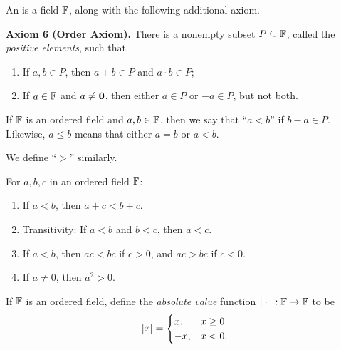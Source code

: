 \documentclass[11pt,twoside=off,numbers=noenddot]{scrbook}
\begin{document}
\begin{definition}
  An  is a field $\mathbb F$, along with the following
  additional axiom.

  \textbf{Axiom 6 (Order Axiom).} There is a nonempty subset $P
  \subseteq \mathbb F$, called the \textit{positive elements}, such that
  \begin{enumerate}
    \item If $a, b \in P$, then $a + b \in P$ and $a \cdot b \in P$;
    \item If $a \in \mathbb F$ and $a \neq \textbf{0}$, then either $a \in P$ or
      $-a \in P$, but not both.
  \end{enumerate}
\end{definition}

\begin{definition}[Inequalities]
  If $\mathbb F$ is an ordered field and $a, b \in \mathbb F$, then we say that
  ``$a < b$'' if $b - a \in P$. Likewise, $a \leq b$ means that
  either $a = b$ or $a < b$.

  We define ``$>$'' similarly.
\end{definition}

\begin{fact}
  For $a, b, c$ in an ordered field $\mathbb F$:
  \begin{enumerate}
    \item If $a < b$, then $a + c < b + c$.
    \item Transitivity: If $a < b$ and $b < c$, then $a < c$.
    \item If $a < b$, then $ac < bc$ if $c > 0$, and $ac > bc$ if $c < 0$.
    \item If $a \neq 0$, then $a^2 > 0$.
  \end{enumerate}
\end{fact}

\begin{definition}
  If $\mathbb F$ is an ordered field, define the \textit{absolute value}
  function $| \cdot | : \mathbb F \to \mathbb F$ to be
  \begin{align*}
    | x | =
    \begin{cases}
      x, & x \geq 0 \\
      -x, & x < 0.
    \end{cases}
  \end{align*}
\end{definition}
\end{document}
